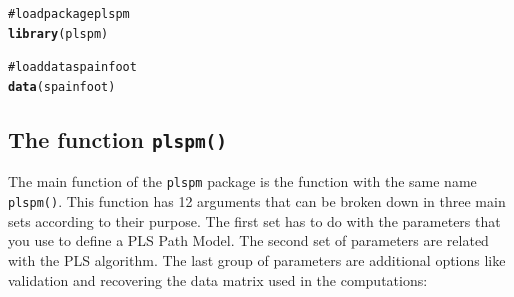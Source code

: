 \documentclass[12pt]{book}\usepackage{graphicx, color}
\makeatletter
\newcommand{\hlfunctioncall}[1]{\textcolor[rgb]{0.501960784313725,0,0.329411764705882}{\textbf{#1}}}%
\newcommand{\hlcomment}[1]{\textcolor[rgb]{0.180392156862745,0.6,0.341176470588235}{#1}}%
\newenvironment{kframe}{%
 \def\at@end@of@kframe{}%
 \ifinner\ifhmode%
  \def\at@end@of@kframe{\end{minipage}}%
  \begin{minipage}{\columnwidth}%
 \fi\fi%
 \def\FrameCommand##1{\hskip\@totalleftmargin \hskip-\fboxsep
 \colorbox{shadecolor}{##1}\hskip-\fboxsep
     \hskip-\linewidth \hskip-\@totalleftmargin \hskip\columnwidth}%
 \MakeFramed {\advance\hsize-\width
   \@totalleftmargin\z@ \linewidth\hsize
   \@setminipage}}%
 {\par\unskip\endMakeFramed%
 \at@end@of@kframe}
\newenvironment{knitrout}{}{} %
\newcommand{\plspm}{\texttt{plspm}}
\newcommand{\fplspm}{\texttt{plspm()}}
\makeatother
\begin{document}
\begin{knitrout}
\color{fgcolor}\begin{kframe}
\begin{alltt}
\hlcomment{# load package plspm}
\hlfunctioncall{library}(plspm)

\hlcomment{# load data spainfoot}
\hlfunctioncall{data}(spainfoot)
\end{alltt}
\end{kframe}
\end{knitrout}



\subsection{The function \fplspm{}}
The main function of the \plspm{} package is the function with the same name \fplspm{}. This function has 12 arguments that can be broken down in three main sets according to their purpose. The first set has to do with the parameters that you use to define a PLS Path Model. The second set of parameters are related with the PLS algorithm. The last group of parameters are additional options like validation and recovering the data matrix used in the computations:
\end{document}
